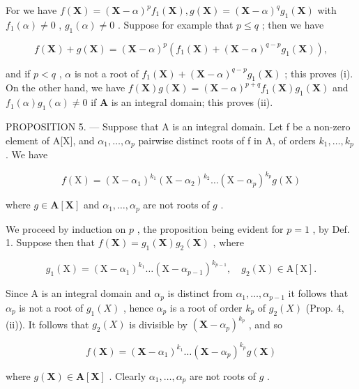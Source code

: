 For we have \(f(\mathbf{X}) = (\mathbf{X} - \alpha)^p f_1(\mathbf{X}), g(\mathbf{X}) = (\mathbf{X} - \alpha)^q g_1(\mathbf{X})\) with \(f_1(\alpha) \neq 0\) , \(g_1(\alpha) \neq 0\) . Suppose for example that \(p \leqslant q\) ; then we have

\[
f (\mathbf {X}) + g (\mathbf {X}) = (\mathbf {X} - \alpha) ^ {p} \left(f _ {1} (\mathbf {X}) + (\mathbf {X} - \alpha) ^ {q - p} g _ {1} (\mathbf {X})\right),
\]

and if \(p < q\) , \(\alpha\) is not a root of \(f_1(\mathbf{X}) + (\mathbf{X} - \alpha)^{q - p} g_1(\mathbf{X})\) ; this proves (i). On the other hand, we have \(f(\mathbf{X})g(\mathbf{X}) = (\mathbf{X} - \alpha)^{p + q} f_1(\mathbf{X})g_1(\mathbf{X})\) and \(f_1(\alpha)g_1(\alpha) \neq 0\) if \(\mathbf{A}\) is an integral domain; this proves (ii).

PROPOSITION 5. --- Suppose that A is an integral domain. Let f be a non-zero element of A{[}X{]}, and \(\alpha_{1},\ldots,\alpha_{p}\) pairwise distinct roots of f in A, of orders \(k_{1},\ldots,k_{p}\) . We have

\[
f (\mathrm{X}) = \left(\mathrm{X} - \alpha_ {1}\right) ^ {k _ {1}} \left(\mathrm{X} - \alpha_ {2}\right) ^ {k _ {2}} \dots \left(\mathrm{X} - \alpha_ {p}\right) ^ {k _ {p}} g (\mathrm{X})
\]

where \(g \in \mathbf{A}[\mathbf{X}]\) and \(\alpha_1, \ldots, \alpha_p\) are not roots of \(g\) .

We proceed by induction on \(p\) , the proposition being evident for \(p = 1\) , by Def. 1. Suppose then that \(f(\mathbf{X}) = g_1(\mathbf{X})g_2(\mathbf{X})\) , where

\[
g _ {1} (\mathrm{X}) = \left(\mathrm{X} - \alpha_ {1}\right) ^ {k _ {1}} \dots \left(\mathrm{X} - \alpha_ {p - 1}\right) ^ {k _ {p - 1}}, \quad g _ {2} (\mathrm{X}) \in \mathrm{A} [ \mathrm{X} ].
\]

Since A is an integral domain and \(\alpha_{p}\) is distinct from \(\alpha_{1},\ldots,\alpha_{p-1}\) it follows that \(\alpha_{p}\) is not a root of \(g_{1}(X)\) , hence \(\alpha_{p}\) is a root of order \(k_{p}\) of \(g_{2}(X)\) (Prop. 4, (ii)). It follows that \(g_{2}(X)\) is divisible by \((\mathbf{X}-\alpha_{p})^{k_{p}}\) , and so

\[
f (\mathbf {X}) = \left(\mathbf {X} - \alpha_ {1}\right) ^ {k _ {1}} \dots \left(\mathbf {X} - \alpha_ {p}\right) ^ {k _ {p}} g (\mathbf {X})
\]

where \(g(\mathbf{X}) \in \mathbf{A}[\mathbf{X}]\) . Clearly \(\alpha_1, \ldots, \alpha_p\) are not roots of \(g\) .

